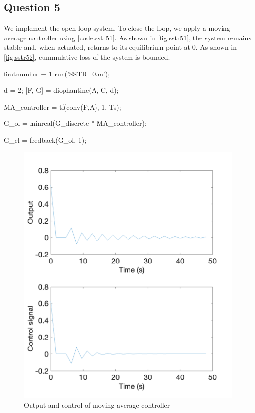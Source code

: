 \FloatBarrier
\subsection{Question 5}
We implement the open-loop system. To close the loop, we apply a moving average controller using \autoref{code:sstr51}. As shown in \autoref{fig:sstr51}, the system remains stable and, when actuated, returns to its equilibrium point at $0$. As shown in \autoref{fig:sstr52}, cummulative loss of the system is bounded.

\begin{code}
	\begin{matlabcode}{firstnumber = 1}
run('SSTR_0.m');

d = 2;  %
[F, G] = diophantine(A, C, d);

MA_controller = tf(conv(F,A), 1, Ts);

G_ol = minreal(G_discrete * MA_controller);

G_cl = feedback(G_ol, 1);
	\end{matlabcode}
	\label{code:sstr51}
\end{code}

\begin{figure}
	\centering
	\includegraphics[width=\textwidth]{images/sstr51.png}
	\caption{Output and control of moving average controller}
	\label{fig:sstr51}
\end{figure}

